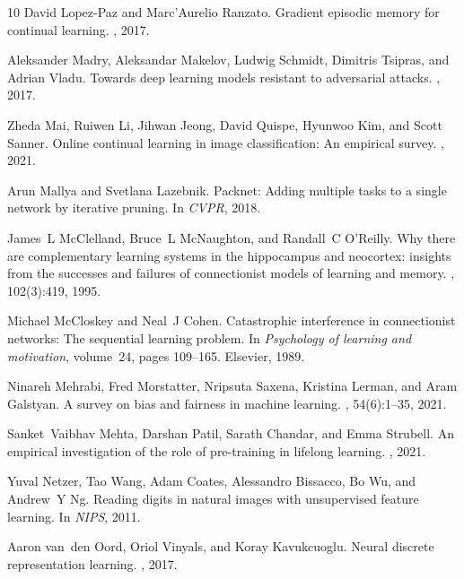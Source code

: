 \documentclass[10pt,twocolumn,letterpaper]{article}
\begin{document}
\begin{thebibliography}{10}
David Lopez-Paz and Marc'Aurelio Ranzato.
\newblock Gradient episodic memory for continual learning.
, 2017.

Aleksander Madry, Aleksandar Makelov, Ludwig Schmidt, Dimitris Tsipras, and
  Adrian Vladu.
\newblock Towards deep learning models resistant to adversarial attacks.
, 2017.

Zheda Mai, Ruiwen Li, Jihwan Jeong, David Quispe, Hyunwoo Kim, and Scott
  Sanner.
\newblock Online continual learning in image classification: An empirical
  survey.
, 2021.

Arun Mallya and Svetlana Lazebnik.
\newblock Packnet: Adding multiple tasks to a single network by iterative
  pruning.
\newblock In {\em CVPR}, 2018.

James~L McClelland, Bruce~L McNaughton, and Randall~C O'Reilly.
\newblock Why there are complementary learning systems in the hippocampus and
  neocortex: insights from the successes and failures of connectionist models
  of learning and memory.
, 102(3):419, 1995.

Michael McCloskey and Neal~J Cohen.
\newblock Catastrophic interference in connectionist networks: The sequential
  learning problem.
\newblock In {\em Psychology of learning and motivation}, volume~24, pages
  109--165. Elsevier, 1989.

Ninareh Mehrabi, Fred Morstatter, Nripsuta Saxena, Kristina Lerman, and Aram
  Galstyan.
\newblock A survey on bias and fairness in machine learning.
, 54(6):1--35, 2021.

Sanket~Vaibhav Mehta, Darshan Patil, Sarath Chandar, and Emma Strubell.
\newblock An empirical investigation of the role of pre-training in lifelong
  learning.
,
  2021.

Yuval Netzer, Tao Wang, Adam Coates, Alessandro Bissacco, Bo Wu, and Andrew~Y
  Ng.
\newblock Reading digits in natural images with unsupervised feature learning.
\newblock In {\em NIPS}, 2011.

Aaron van~den Oord, Oriol Vinyals, and Koray Kavukcuoglu.
\newblock Neural discrete representation learning.
, 2017.


\end{thebibliography}
\end{document}
